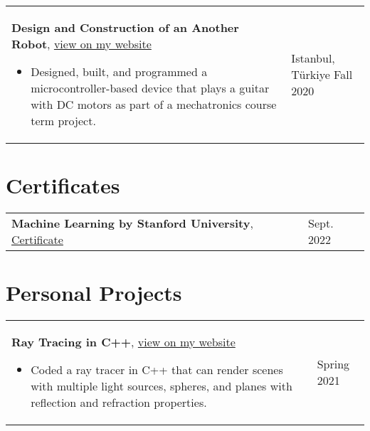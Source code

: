 \documentclass[10pt, a4paper]{article}
\newenvironment{highlights}{
        \begin{itemize}[
                topsep=0pt,
                parsep=0.10 cm,
                partopsep=0pt,
                itemsep=0pt,
                after=\vspace{-1\baselineskip},
                leftmargin=0.4 cm + 3pt
            ]
    }{
        \end{itemize}
    } %
\let\hrefWithoutArrow\href
\renewcommand{\href}[2]{\hrefWithoutArrow{#1}{#2 \raisebox{.15ex}{\footnotesize \faExternalLink*}}}
\begin{document}
        \vspace{0.2 cm}
        \begin{tabularx}{ cm-0.13cm}{K{0.2 cm} R{3.6 cm}}
            \textbf{Design and Construction of an Another Robot}, \href{https://example.com/}{view on my website}
            \vspace{0.10 cm}
            \begin{highlights}
                \item Designed, built, and programmed a microcontroller-based device that plays a guitar with DC motors as part of a mechatronics course term project. \hspace*{-0.2cm}
            \end{highlights}
        &
            Istanbul, Türkiye \newline
            Fall 2020
        \end{tabularx}



    \section{Certificates}
    
        \begin{tabularx}{ cm-0.13cm}{K{0.2 cm} R{3.6 cm}}
            \textbf{Machine Learning by Stanford University}, \href{https://example.com/}{Certificate}
            \vspace{0.10 cm}
        &
            Sept. 2022
        \end{tabularx}



    \section{Personal Projects}
    
        \begin{tabularx}{ cm-0.13cm}{K{0.2 cm} R{3.6 cm}}
            \textbf{Ray Tracing in C++}, \href{https://example.com/}{view on my website}
            \vspace{0.10 cm}
            \begin{highlights}
                \item Coded a ray tracer in C++ that can render scenes with multiple light sources, spheres, and planes with reflection and refraction properties. \hspace*{-0.2cm}
            \end{highlights}
        &
            Spring 2021
        \end{tabularx}
\end{document}
